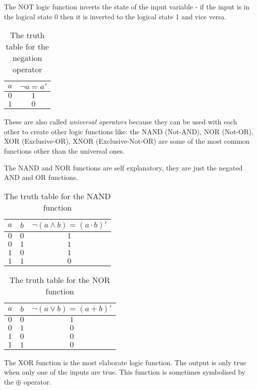 The NOT logic function inverts the state of the input variable - if the input is in the logical state 0
then it is inverted to the logical state 1 and vice versa.
\begin{table}[ht]
    \centering
    \begin{tabular}{c|c}
        $a$ & $\lnot a = a'$ \\
        \hline
        $0$ & $1$ \\
        $1$ & $0$ \\
    \end{tabular}
    \caption{The truth table for the negation operator}
\end{table}

These are also called \textit{universal operators} because they can be used with each other to create
other logic functions like: the NAND (Not-AND), NOR (Not-OR), XOR (Exclusive-OR), XNOR (Exclusive-Not-OR)
are some of the most common functions other than the universal ones.

The NAND and NOR functions are self explanatory, they are just the negated AND and OR functions.
\begin{table}[ht]
    \centering
    \begin{tabular}{cc|c}
        $a$ & $b$ & $\lnot(a \land b) = (a \cdot b)'$ \\
        \hline
        $0$ & $0$ & $1$ \\
        $0$ & $1$ & $1$ \\
        $1$ & $0$ & $1$ \\
        $1$ & $1$ & $0$ \\
    \end{tabular}
    \caption{The truth table for the NAND function}
\end{table}
\hspace{1cm}
\begin{table}[ht]
    \centering
    \begin{tabular}{cc|c}
        $a$ & $b$ & $\lnot(a \lor b) = (a + b)'$ \\
        \hline
        $0$ & $0$ & $1$ \\
        $0$ & $1$ & $0$ \\
        $1$ & $0$ & $0$ \\
        $1$ & $1$ & $0$ \\
    \end{tabular}
    \caption{The truth table for the NOR function}
\end{table}

The XOR function is the most elaborate logic function. The output is only true when only one of the 
inputs are true. This function is sometimes symbolised by the $\oplus$ operator.

